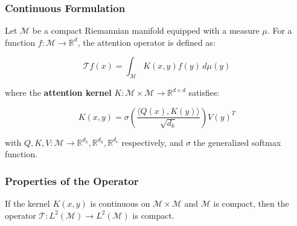 \subsubsection{Continuous Formulation}

Let $\mathcal{M}$ be a compact Riemannian manifold equipped with a measure $\mu$. For a function $f: \mathcal{M} \to \mathbb{R}^d$, the attention operator is defined as:

\begin{equation}
    \mathcal{T}f(x) = \int_{\mathcal{M}} K(x, y) f(y) \, d\mu(y)
    \label{eq:attention_integral_operator}
\end{equation}

where the \textbf{attention kernel} $K: \mathcal{M} \times \mathcal{M} \to \mathbb{R}^{d \times d}$ satisfies:

\begin{equation}
    K(x, y) = \sigma\left(\frac{\langle Q(x), K(y) \rangle}{\sqrt{d_k}}\right) V(y)^T
    \label{eq:attention_kernel}
\end{equation}

with $Q, K, V: \mathcal{M} \to \mathbb{R}^{d_k}, \mathbb{R}^{d_k}, \mathbb{R}^{d_v}$ respectively, and $\sigma$ the generalized softmax function.

\subsubsection{Properties of the Operator}

\begin{proposition}\label{prop:attention_compactness}
    If the kernel $K(x,y)$ is continuous on $\mathcal{M} \times \mathcal{M}$ and $\mathcal{M}$ is compact, then the operator $\mathcal{T}: L^2(\mathcal{M}) \to L^2(\mathcal{M})$ is compact.
\end{proposition}

